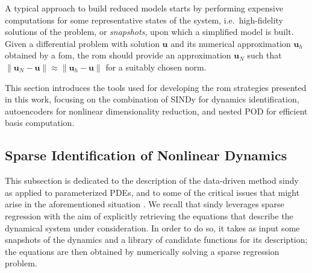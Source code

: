 \documentclass[reqno]{amsart}[standalone]
\theoremstyle{definition}
\theoremstyle{remark}
\newcommand{\bs}{\boldsymbol}
\begin{document}
A typical approach to build reduced models starts by performing expensive computations for some representative states of the system, i.e.\ high-fidelity solutions of the problem, or \textit{snapshots},  upon which a simplified model is built. Given a differential problem with solution $\bs{u}$ and its numerical approximation $\bs{u}_h$ obtained by a \gls{fom}, the \gls{rom} should provide an approximation $\bs{u}_N$ such that $\|\bs{u}_N-\bs{u}\|\approx\|\bs{u}_h-\bs{u}\|$ for a suitably chosen norm.

This section introduces the tools used for developing the \gls{rom} strategies presented in this work, focusing on the combination of SINDy for dynamics identification, autoencoders for nonlinear dimensionality reduction, and nested POD for efficient basis computation.

\subsection{Sparse Identification of Nonlinear Dynamics}\label{subsec:sindy}
This subsection is dedicated to the description of the data-driven method \gls{sindy} as applied to parameterized PDEs, and to some of the critical issues that might arise in the aforementioned situation \parencite{Brunton_2016,Champion_2019,SINDyCP,Conti_2023}.
We recall that \gls{sindy} leverages sparse regression with the aim of explicitly retrieving the equations that describe the dynamical system under consideration.
In order to do so, it takes as input some snapshots of the dynamics and a library of candidate functions for its description; the equations are then obtained by numerically solving a sparse regression problem.
\end{document}
